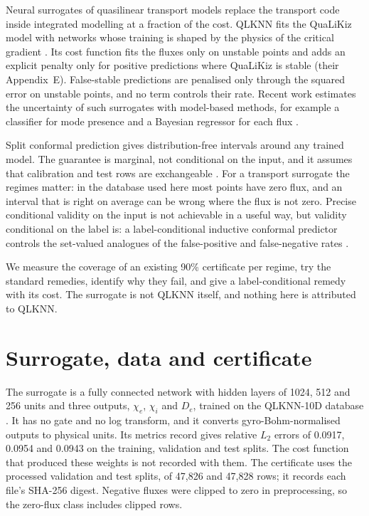 \documentclass[11pt]{article}
\begin{document}
Neural surrogates of quasilinear transport models replace the transport code
inside integrated modelling at a fraction of the cost.  QLKNN fits the
QuaLiKiz model with networks whose training is shaped by the physics of the
critical gradient \citep{vandePlassche2020}.  Its cost function fits the fluxes
only on unstable points and adds an explicit penalty only for positive
predictions where QuaLiKiz is stable (their Appendix~E).  False-stable
predictions are penalised only through the squared error on unstable points,
and no term controls their rate.  Recent work estimates the uncertainty of
such surrogates with model-based methods, for example a classifier for mode
presence and a Bayesian regressor for each flux \citep{Ho2025}.

Split conformal prediction gives distribution-free intervals around any
trained model.  The guarantee is marginal, not conditional on the input, and
it assumes that calibration and test rows are exchangeable
\citep{Gopakumar2026}.  For a transport surrogate the regimes matter: in the
database used here most points have zero flux, and an interval that is right
on average can be wrong where the flux is not zero.  Precise conditional
validity on the input is not achievable in a useful way, but validity
conditional on the label is: a label-conditional inductive conformal predictor
controls the set-valued analogues of the false-positive and false-negative
rates \citep{Vovk2012}.

We measure the coverage of an existing 90\% certificate per regime, try the
standard remedies, identify why they fail, and give a label-conditional
remedy with its cost.  The surrogate is not QLKNN itself, and nothing here is
attributed to QLKNN.

\section{Surrogate, data and certificate}

The surrogate is a fully connected network with hidden layers of 1024, 512 and
256 units and three outputs, $\chi_e$, $\chi_i$ and $D_e$, trained on the
QLKNN-10D database \citep{QLKNN10D2019}.  It has no gate and no log transform,
and it converts gyro-Bohm-normalised outputs to physical units.  Its metrics
record gives relative $L_2$ errors of 0.0917, 0.0954 and 0.0943 on the
training, validation and test splits.  The cost function that produced these
weights is not recorded with them.  The certificate uses the processed validation and
test splits, of 47,826 and 47,828 rows; it records each file's SHA-256 digest.  Negative fluxes were clipped to zero in preprocessing, so the
zero-flux class includes clipped rows.
\end{document}
